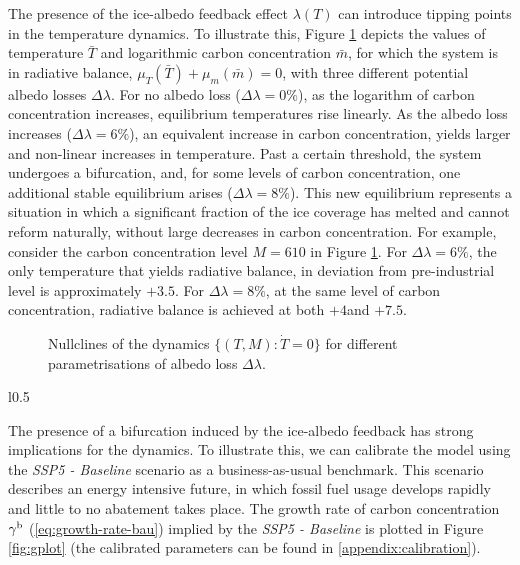 \documentclass[../../main.tex]{subfiles}
\begin{document}
The presence of the ice-albedo feedback effect $\lambda(T)$ can introduce tipping points in the temperature dynamics.  To illustrate this, Figure \ref{fig:nullclines} depicts the values of temperature $\bar{T}$ and logarithmic carbon concentration $\bar m$, for which the system is in radiative balance, $\mu_T(\bar{T}) + \mu_m(\bar{m}) = 0$, with three different potential albedo losses $\Delta \lambda$. For no albedo loss ($\Delta \lambda = 0\%$), as the logarithm of carbon concentration increases, equilibrium temperatures rise linearly. As the albedo loss increases ($\Delta \lambda = 6\%$), an equivalent increase in carbon concentration, yields larger and non-linear increases in temperature. Past a certain threshold, the system undergoes a bifurcation,  and, for some levels of carbon concentration, one additional stable equilibrium arises ($\Delta \lambda = 8\%$). This new equilibrium represents a situation in which a significant fraction of the ice coverage has melted and cannot reform naturally, without large decreases in carbon concentration. For example, consider the carbon concentration level $M = 610$ in Figure \ref{fig:nullclines}. For $\Delta \lambda = 6\%$, the only temperature that yields radiative balance, in deviation from pre-industrial level is approximately $+3.5$\degree. For $\Delta \lambda = 8\%$, at the same level of carbon concentration, radiative balance is achieved at both $+4$\degree and $+7.5$\degree. 

\begin{figure}[H]
    \centering
    \caption{Nullclines of the dynamics $\{(T, M): \dot{T} = 0\}$ for different parametrisations of albedo loss $\Delta \lambda$.}
    \label{fig:nullclines}
\end{figure}

\begin{wrapfigure}{l}{0.5\textwidth}
    \caption{}
    \label{fig:gplot}
\end{wrapfigure}
The presence of a bifurcation induced by the ice-albedo feedback has strong implications for the dynamics. To illustrate this, we can calibrate the model using the \textit{SSP5 - Baseline} scenario \citep{kriegler_fossil-fueled_2017} as a business-as-usual benchmark. This scenario describes an energy intensive future, in which fossil fuel usage develops rapidly and little to no abatement takes place. The growth rate of carbon concentration $\gamma^{\mathrm{b}}$ (\ref{eq:growth-rate-bau}) implied by the \textit{SSP5 - Baseline} is plotted in Figure \ref{fig:gplot} (the calibrated parameters can be found in \ref{appendix:calibration}).
\end{document}

